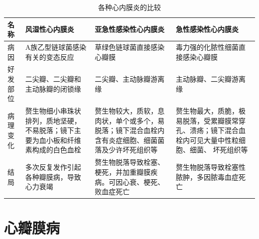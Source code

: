 \begin{table}
    \centering
    \caption{各种心内膜炎的比较}
    \label{tab6-1}
    \begin{tabular}{lp{4cm}p{4cm}p{4cm}}
        \toprule
        名称                                                                                               & 风湿性心内膜炎                                                                   & 亚急性感染性心内膜炎                                                 & 急性感染性心内膜炎                         \\
        \midrule
        病因                                                                                               & A族乙型链球菌感染有关的变态反应                                                  & 草绿色链球菌直接感染心瓣膜                                           & 毒力强的化脓性细菌直接感染心瓣膜
        \\
        好发部位                                                                                           & 二尖瓣、二尖瓣和主动脉瓣的闭锁缘                                                 & 二尖瓣、主动脉瓣游离缘                                               & 主动脉瓣、二尖瓣游离缘
        \\
        病理变化                                                                                           & 赘生物细小串珠状排列，质地坚硬，不易脱落；镜下主要为血小板和纤维素构成的白色血栓 &
        赘生物较大，质软，息肉状，单个或多个，易脱落；镜下混合血栓内含有炎症细胞、细菌菌落及少许坏死组织等 &
        赘生物最大，质脆，极易脱落，受累瓣膜常穿孔、溃疡；镜下混合血栓内可见大量中性粒细胞、细菌、 坏死组织等                                                                                                                                                                                                     \\
        结局                                                                                               & 多次反复发作引起各种瓣膜病，导致心力衰竭                                         & 赘生物脱落导致栓塞、梗死，并加重瓣膜疾病。可因心衰、梗死、败血症死亡 & 赘生物脱落导致栓塞性脓肿，多因脓毒血症死亡 \\
        \bottomrule
    \end{tabular}
\end{table}

\section{心瓣膜病}

